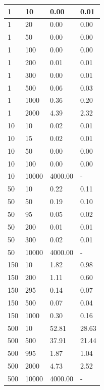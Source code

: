 \begin{table}[h!]
\begin{minipage}{.45\textwidth}
{\begin{tabular}{llll}
1  &       10  &      0.00  &    0.01 \\\hline
1  &       20  &      0.00  &    0.00 \\\hline
1  &       50  &      0.00  &    0.00 \\\hline
1  &       100  &     0.00  &    0.00 \\\hline
1  &       200  &     0.01  &    0.01 \\\hline
1  &       300  &     0.00  &    0.01 \\\hline
1  &       500  &     0.06  &    0.03 \\\hline
1  &       1000  &    0.36  &    0.20 \\\hline
1  &       2000  &    4.39  &    2.32 \\\hline
10  &      10  &      0.02  &    0.01 \\\hline
10  &      15  &      0.02  &    0.01 \\\hline
10  &      50  &      0.00  &    0.00 \\\hline
10  &      100  &     0.00  &    0.00 \\\hline
10  &    10000  &  4000.00 & - \\\hline
50  &      10  &      0.22  &    0.11 \\\hline
50  &      50  &      0.19  &    0.10 \\\hline
50  &      95  &      0.05  &    0.02 \\\hline
50  &      200  &     0.01  &    0.01 \\\hline
50  &      300  &     0.02  &    0.01 \\\hline
50  &    10000  &  4000.00  &   - \\ \hline
150  &     10  &      1.82  &    0.98 \\\hline
150  &     200  &     1.11  &    0.60 \\\hline
150  &     295  &     0.14  &    0.07 \\\hline
150  &     500  &     0.07  &    0.04 \\\hline
150  &     1000  &    0.30  &    0.16 \\\hline
500  &     10  &      52.81  &   28.63 \\\hline
500  &     500  &     37.91  &   21.44 \\\hline
500  &     995  &     1.87  &    1.04 \\\hline
500  &     2000  &    4.73  &    2.52 \\\hline
500  &     10000  &   4000.00  & - \\ \hline

\end{tabular}}
\end{minipage}
\end{table}
